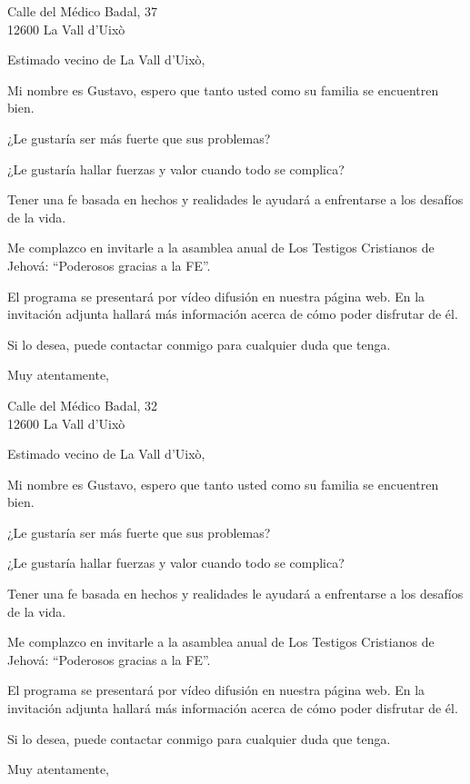 \documentclass{scrlttr2}
\begin{document}
\begin{letter}{%
Calle del Médico Badal, 37\\
12600 La Vall d'Uixò\\
}
\opening{Estimado vecino de La Vall d'Uixò,}

Mi nombre es Gustavo, espero que tanto usted como su familia se encuentren bien.

¿Le gustaría ser más fuerte que sus problemas?

¿Le gustaría hallar fuerzas y valor cuando todo se complica?

Tener una fe basada en hechos y realidades le ayudará a enfrentarse a los desafíos de la vida.

Me complazco en invitarle a la asamblea anual de Los Testigos Cristianos de Jehová: ``Poderosos gracias a la FE''.

El programa se presentará por vídeo difusión en nuestra página web. En la invitación adjunta hallará más información acerca de cómo poder disfrutar de él.

Si lo desea, puede contactar conmigo para cualquier duda que tenga.

\closing{Muy atentamente,}


\end{letter}
\begin{letter}{%
Calle del Médico Badal, 32\\
12600 La Vall d'Uixò\\
}
\opening{Estimado vecino de La Vall d'Uixò,}

Mi nombre es Gustavo, espero que tanto usted como su familia se encuentren bien.

¿Le gustaría ser más fuerte que sus problemas?

¿Le gustaría hallar fuerzas y valor cuando todo se complica?

Tener una fe basada en hechos y realidades le ayudará a enfrentarse a los desafíos de la vida.

Me complazco en invitarle a la asamblea anual de Los Testigos Cristianos de Jehová: ``Poderosos gracias a la FE''.

El programa se presentará por vídeo difusión en nuestra página web. En la invitación adjunta hallará más información acerca de cómo poder disfrutar de él.

Si lo desea, puede contactar conmigo para cualquier duda que tenga.

\closing{Muy atentamente,}


\end{letter}
\end{document}
